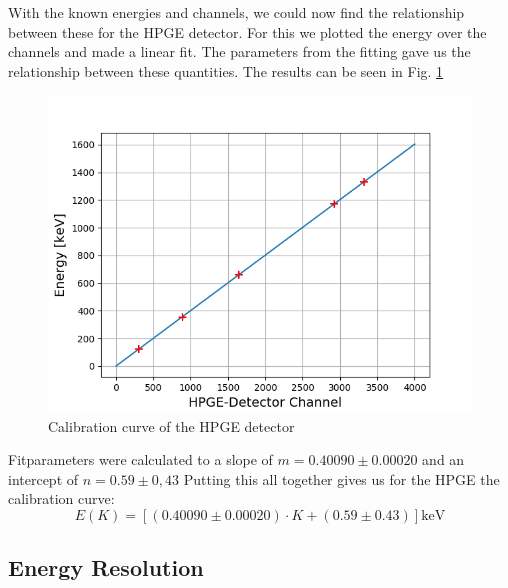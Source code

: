 With the known energies and channels, we could now find the relationship between these for the HPGE detector.
For this we plotted the energy over the channels and made a linear fit. 
The parameters from the fitting gave us the relationship between these quantities.
The results can be seen in Fig. \ref{hpge_kali}

\begin{figure}[h]
  \includegraphics[width=\linewidth]{../Plots/hgpe_kali.png}
  \caption{Calibration curve of the HPGE detector}
  \label{hpge_kali}
\end{figure}
Fitparameters were calculated to a slope of $m = 0.40090 \pm 0.00020$ and an intercept of $n = 0.59 \pm 0,43$
Putting this all together gives us for the HPGE the calibration curve:
\begin{equation}
E(K) = [(0.40090 \pm 0.00020) \cdot K + (0.59 \pm 0.43)]  \text{keV}
\end {equation}

\clearpage

\subsection{Energy Resolution}

